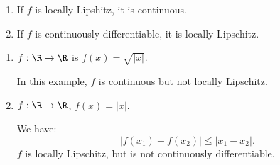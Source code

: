 \begin{property}
	\begin{enumerate}
		\item If $f$ is locally Lipshitz, it is continuous. 
		\item If $f$ is continuously differentiable, it is locally Lipschitz. 
	\end{enumerate}
\end{property}

\begin{example}
	\begin{enumerate}
		\item $f : \R \to \R$ is $f\left( x \right)  = \sqrt{|x|} $. 

			In this example, $f$ is continuous but not locally Lipschitz. 
		\item $f : \R \to \R$, $f\left( x \right)  = |x|$. 

			We have:
			\[
				|f\left( x_1 \right) - f\left( x_2 \right) | \le  |x_1 - x_2|
			.\] 
			$f$ is locally Lipschitz, but is not continuously differentiable. 
	\end{enumerate}
\end{example}
